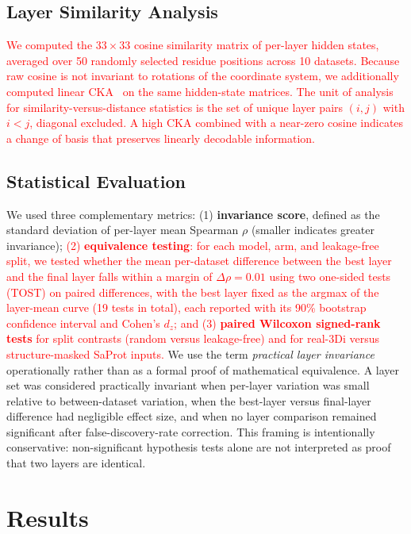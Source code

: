 \documentclass[11pt,a4paper]{article}
\newcommand{\revised}[1]{\textcolor{red}{#1}}
\begin{document}
\subsection{Layer Similarity Analysis}

\revised{We computed the $33 \times 33$ cosine similarity matrix of per-layer hidden states,
averaged over 50 randomly selected residue positions across 10 datasets. Because raw
cosine is not invariant to rotations of the coordinate system, we additionally computed
linear CKA~\cite{kornblith2019similarity} on the same hidden-state matrices. The unit
of analysis for similarity-versus-distance statistics is the set of unique layer pairs
$(i, j)$ with $i < j$, diagonal excluded. A high CKA combined with a near-zero cosine
indicates a change of basis that preserves linearly decodable information.}

\subsection{Statistical Evaluation}

We used three complementary metrics: (1) \textbf{invariance score}, defined as
the standard deviation of per-layer mean Spearman $\rho$ (smaller indicates greater invariance);
\revised{(2) \textbf{equivalence testing}: for each model, arm, and leakage-free split,
we tested whether the mean per-dataset difference between the best layer and the final
layer falls within a margin of $\Delta\rho = 0.01$ using two one-sided tests (TOST) on
paired differences, with the best layer fixed as the argmax of the layer-mean curve
(19 tests in total), each reported with its 90\% bootstrap confidence interval and
Cohen's $d_z$; and (3) \textbf{paired Wilcoxon signed-rank tests} for split contrasts
(random versus leakage-free) and for real-3Di versus structure-masked SaProt inputs.}
We use the term \emph{practical layer invariance} operationally rather than as a
formal proof of mathematical equivalence. A layer set was considered practically
invariant when per-layer variation was small relative to between-dataset variation,
when the best-layer versus final-layer difference had negligible effect size, and
when no layer comparison remained significant after false-discovery-rate correction.
This framing is intentionally conservative: non-significant hypothesis tests alone
are not interpreted as proof that two layers are identical.

\section{Results}
\end{document}
